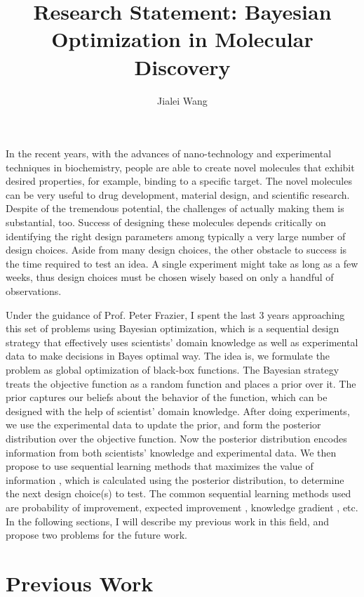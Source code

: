 \documentclass[11pt]{article}
\title{Research Statement: Bayesian Optimization in Molecular Discovery}
\author{Jialei Wang}
\affil{Operations Research \& Information Engineering, Cornell University}
\date{\vspace{-5ex}} %
\begin{document}
\maketitle

In the recent years, with the advances of nano-technology and experimental techniques
in biochemistry, people are able to create novel molecules that exhibit desired
properties, for example, binding to a specific target. The novel molecules can 
be very useful to drug development, material design, and scientific research. Despite
of the tremendous potential, the challenges of actually making them is substantial,
too. Success of designing these molecules depends critically on identifying the
right design parameters among typically a very large number of design choices.
Aside from many design choices, the other obstacle to success is the time required to
test an idea. A single experiment might take as long as a few weeks, thus design
choices must be chosen wisely based on only a handful of observations. 

Under the guidance of Prof. Peter Frazier, I spent the last 3 years approaching
this set of problems using Bayesian optimization, which is a sequential design strategy
that effectively uses scientists' domain knowledge as well as experimental data to make
decisions in Bayes optimal way. The idea is, we formulate the problem as global
optimization of black-box functions. The Bayesian strategy treats 
the objective function as a random function and places a prior over it. The prior
captures our beliefs about the behavior of the function, which can be designed 
with the help of scientist' domain knowledge. After doing experiments, we use
the experimental data to update the prior, and form the posterior distribution
over the objective function. Now the posterior distribution encodes information
from both scientists' knowledge and experimental data. We then propose to use 
sequential learning methods that maximizes the value of information 
\citep{howard1966information}, which is calculated using the posterior distribution,
to determine the next design choice(s) to test. The common sequential learning 
methods used are probability of improvement\citep{kushner1964new}, expected improvement \citep{jones1998efficient},
knowledge gradient \citep{frazier2009knowledge}, etc. In the following sections, 
I will describe my previous work in this field, and propose two problems for the
future work.

\section{Previous Work}
\end{document}
